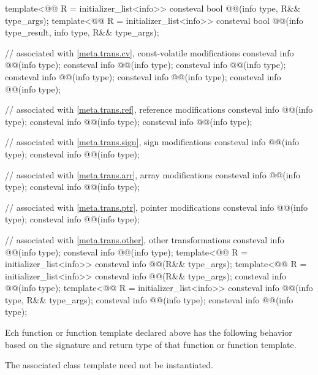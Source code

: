 \begin{codeblock}
template<@@ R = initializer_list<info>>
  consteval bool @@(info type, R&& type_args);
template<@@ R = initializer_list<info>>
  consteval bool
    @@(info type_result, info type, R&& type_args);

// associated with \ref{meta.trans.cv}, const-volatile modifications
consteval info @@(info type);
consteval info @@(info type);
consteval info @@(info type);
consteval info @@(info type);
consteval info @@(info type);
consteval info @@(info type);

// associated with \ref{meta.trans.ref}, reference modifications
consteval info @@(info type);
consteval info @@(info type);
consteval info @@(info type);

// associated with \ref{meta.trans.sign}, sign modifications
consteval info @@(info type);
consteval info @@(info type);

// associated with \ref{meta.trans.arr}, array modifications
consteval info @@(info type);
consteval info @@(info type);

// associated with \ref{meta.trans.ptr}, pointer modifications
consteval info @@(info type);
consteval info @@(info type);

// associated with \ref{meta.trans.other}, other transformations
consteval info @@(info type);
consteval info @@(info type);
template<@@ R = initializer_list<info>>
  consteval info @@(R&& type_args);
template<@@ R = initializer_list<info>>
  consteval info @@(R&& type_args);
consteval info @@(info type);
template<@@ R = initializer_list<info>>
  consteval info @@(info type, R&& type_args);
consteval info @@(info type);
consteval info @@(info type);
\end{codeblock}

\pnum
Ech function or function template declared above has the following behavior
based on the signature and return type of that function or function template.
\begin{note}
The associated class template need not be instantiated.
\end{note}

